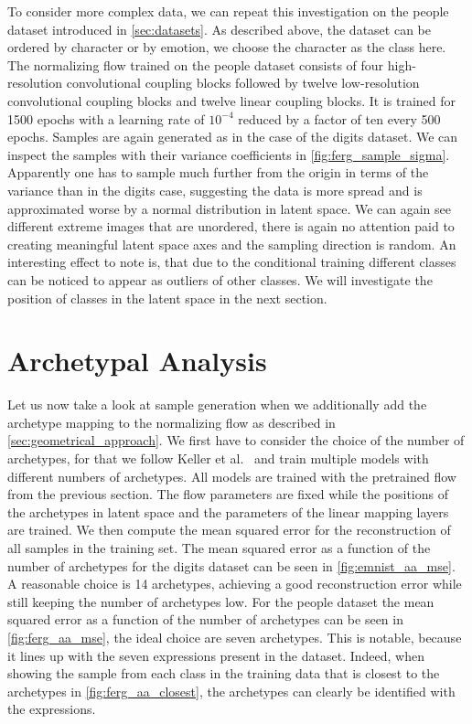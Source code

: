 To consider more complex data, we can repeat this investigation on the people
dataset introduced in \autoref{sec:datasets}. As described above, the dataset
can be ordered by character or by emotion, we choose the character as the class
here. The normalizing flow trained on the people dataset consists of four high-resolution
convolutional coupling blocks followed by twelve low-resolution convolutional
coupling blocks and twelve linear coupling blocks. It is trained for 1500
epochs with a learning rate of $10^{-4}$ reduced by a factor of ten every 500
epochs. Samples are again generated as in the case of the digits dataset. We
can inspect the samples with their variance coefficients in
\autoref{fig:ferg_sample_sigma}. Apparently one has to sample
much further from the origin in terms of the variance than in the digits case,
suggesting the data is more spread and is approximated worse by a normal
distribution in latent space. We can again see different extreme images that
are unordered, there is again no attention paid to creating meaningful
latent space axes and the sampling direction is random. An interesting effect
to note is, that due to the conditional training different classes can be
noticed to appear as outliers of other classes. We will investigate the
position of classes in the latent space in the next section.

\section{Archetypal Analysis}%
\label{sec:archetypal_analysis}

Let us now take a look at sample generation when we additionally add the
archetype mapping to the normalizing flow as described in
\autoref{sec:geometrical_approach}. We first have to consider the choice of the
number of archetypes, for that we follow Keller et
al.~\citep{kellerLearningExtremalRepresentations2020} and train multiple models
with different numbers of archetypes. All models are trained with the
pretrained flow from the previous section. The flow parameters are fixed while
the positions of the archetypes in latent space and the parameters of the
linear mapping layers are trained. We then compute
the mean squared error for the reconstruction of all samples in the training
set. The mean squared error as a function of the number of archetypes for the
digits dataset can be seen in \autoref{fig:emnist_aa_mse}. A reasonable choice
is 14 archetypes, achieving a good reconstruction error while still keeping the
number of archetypes low. For the people dataset the mean squared error as a
function of the number of archetypes can be seen in \autoref{fig:ferg_aa_mse},
the ideal choice are seven archetypes. This is notable, because it lines up
with the seven expressions present in the dataset. Indeed,
when showing the sample from each class in the training data that is closest to
the archetypes in \autoref{fig:ferg_aa_closest}, the archetypes can clearly be
identified with the expressions.

